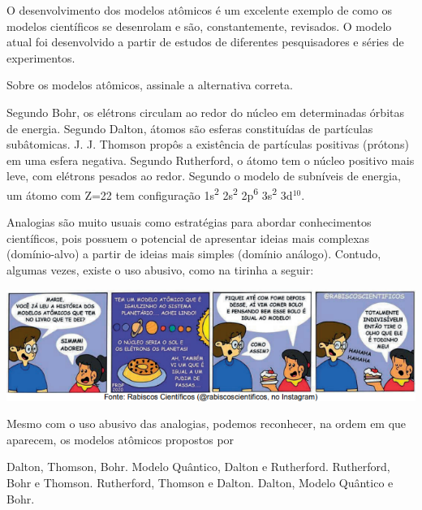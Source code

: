 \documentclass[9 pt]{scrartcl}
\def\PQ{0.84} %
\begin{document}
\begin{exercise}[points=\PQ]
O desenvolvimento dos modelos atômicos é um excelente exemplo de como os modelos científicos se desenrolam e são, constantemente, revisados. O modelo atual foi desenvolvido a partir de estudos de diferentes pesquisadores e séries de experimentos.

Sobre os modelos atômicos, assinale a alternativa correta.

\begin{choice}


\choice Segundo Bohr, os elétrons circulam ao redor do núcleo em determinadas órbitas de energia. 
\choice Segundo Dalton, átomos são esferas constituídas de partículas subâtomicas.
\choice J. J. Thomson propôs a existência de partículas positivas (prótons) em uma esfera negativa.
\choice Segundo Rutherford, o átomo tem o núcleo positivo mais leve, com elétrons pesados ao redor.
\choice Segundo o modelo de subníveis de energia, um átomo com Z=22 tem configuração 1s\textsuperscript{2} 2s\textsuperscript{2} 2p\textsuperscript{6} 3s\textsuperscript{2} 3d$^{10}$.
\end{choice}
\end{exercise}


\begin{exercise}
Analogias são muito usuais como estratégias para abordar conhecimentos científicos, pois possuem o potencial de apresentar ideias mais complexas (domínio-alvo) a partir de ideias mais simples (domínio análogo). Contudo, algumas vezes, existe o uso abusivo, como na tirinha a seguir:

\begin{center}
\includegraphics[width=.9\linewidth]{Quimica_Geral/TeoriaAtomica/charge2.png}
\end{center}

Mesmo com o uso abusivo das analogias, podemos reconhecer, na ordem em que aparecem, os modelos atômicos propostos por

\begin{choice}
\choice Dalton, Thomson, Bohr.
\choice Modelo Quântico, Dalton e Rutherford.
\choice Rutherford, Bohr e Thomson. 
\choice Rutherford, Thomson e Dalton.
\choice Dalton, Modelo Quântico e Bohr.
\end{choice}
\end{exercise}
\end{document}
